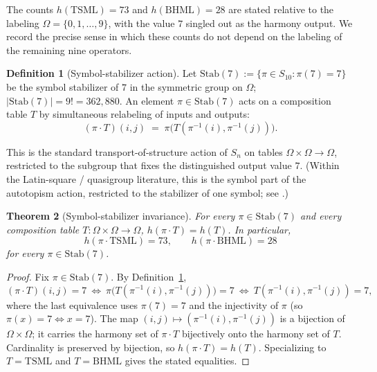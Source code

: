 \documentclass[11pt,reqno]{amsart}
\theoremstyle{plain}
\newtheorem{theorem}{Theorem}
\theoremstyle{definition}
\newtheorem{definition}[theorem]{Definition}
\theoremstyle{remark}
\newcommand{\TSML}{\mathrm{TSML}}
\newcommand{\BHML}{\mathrm{BHML}}
\begin{document}
The counts $h(\TSML) = 73$ and $h(\BHML) = 28$ are stated relative
to the labeling $\Omega = \{0, 1, \ldots, 9\}$, with the value $7$
singled out as the harmony output. We record the precise sense in
which these counts do not depend on the labeling of the remaining
nine operators.

\begin{definition}[Symbol-stabilizer action]\label{def:lens}
Let $\mathrm{Stab}(7) := \{\pi \in S_{10} : \pi(7) = 7\}$ be the
symbol stabilizer of $7$ in the symmetric group on $\Omega$;
$|\mathrm{Stab}(7)| = 9! = 362{,}880$. An element $\pi \in
\mathrm{Stab}(7)$ acts on a composition table $T$ by simultaneous
relabeling of inputs and outputs:
\[
  (\pi \cdot T)(i, j) \;=\; \pi\bigl(T(\pi^{-1}(i), \pi^{-1}(j))\bigr).
\]
\end{definition}

This is the standard transport-of-structure action of $S_n$ on
tables $\Omega \times \Omega \to \Omega$, restricted to the
subgroup that fixes the distinguished output value $7$. (Within
the Latin-square / quasigroup literature, this is the symbol part
of the autotopism action, restricted to the stabilizer of one
symbol; see \cite{McKayWanless2005,DrapalWanless2021}.)

\begin{theorem}[Symbol-stabilizer invariance]\label{thm:lens}
For every $\pi \in \mathrm{Stab}(7)$ and every composition table
$T : \Omega \times \Omega \to \Omega$,
$h(\pi \cdot T) = h(T)$. In particular,
\[
  h(\pi \cdot \TSML) = 73, \qquad h(\pi \cdot \BHML) = 28
\]
for every $\pi \in \mathrm{Stab}(7)$.
\end{theorem}

\begin{proof}
Fix $\pi \in \mathrm{Stab}(7)$. By Definition~\ref{def:lens},
\[
  (\pi \cdot T)(i, j) = 7
  \ \iff\ \pi\bigl(T(\pi^{-1}(i), \pi^{-1}(j))\bigr) = 7
  \ \iff\ T(\pi^{-1}(i), \pi^{-1}(j)) = 7,
\]
where the last equivalence uses $\pi(7) = 7$ and the injectivity
of $\pi$ (so $\pi(x) = 7 \iff x = 7$). The map
$(i, j) \mapsto (\pi^{-1}(i), \pi^{-1}(j))$ is a bijection of
$\Omega \times \Omega$; it carries the harmony set of
$\pi \cdot T$ bijectively onto the harmony set of $T$.
Cardinality is preserved by bijection, so
$h(\pi \cdot T) = h(T)$. Specializing to $T = \TSML$ and
$T = \BHML$ gives the stated equalities.
\end{proof}
\end{document}
